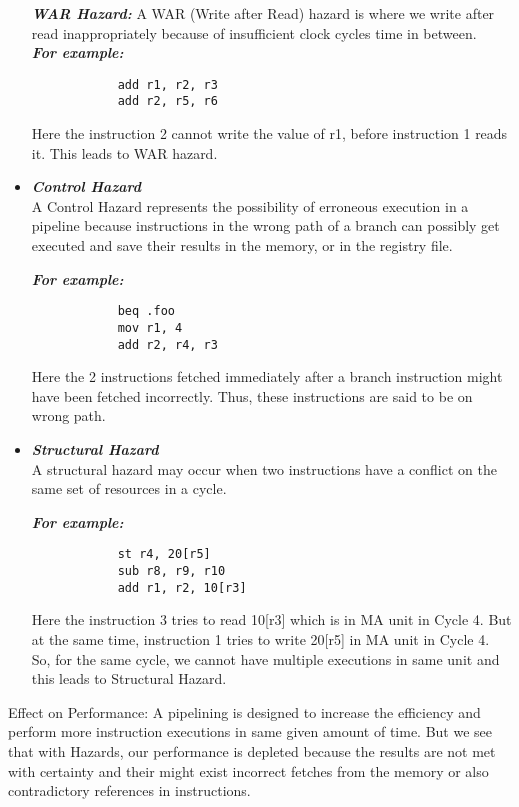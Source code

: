 \documentclass[12pt]{article}
\begin{document}
\begin{itemize}
        \textbf{\textit{WAR Hazard:}} A WAR (Write after Read) hazard is where we write after read inappropriately because of insufficient clock cycles time in between. \\
        \textbf{\textit{For example:}}
        \begin{verbatim}
            add r1, r2, r3
            add r2, r5, r6
        \end{verbatim}
        Here the instruction 2 cannot write the value of r1, before instruction 1 reads it. This leads to WAR hazard.
        
    \item \textbf{\textit{Control Hazard}}\\
        A Control Hazard represents the possibility of erroneous execution in a pipeline because instructions in the wrong path of a branch can possibly get executed and save their results in the memory, or in the registry file.
        
        \textbf{\textit{For example:}}
        \begin{verbatim}
            beq .foo
            mov r1, 4
            add r2, r4, r3
        \end{verbatim}
        Here the 2 instructions fetched immediately after a branch instruction might have been fetched incorrectly. Thus, these instructions are said to be on wrong path.
    
    \item \textbf{\textit{Structural Hazard}}\\
        A structural hazard may occur when two instructions have a conflict on the same set of resources in a cycle.
        
        \textbf{\textit{For example:}}
        \begin{verbatim}
            st r4, 20[r5]
            sub r8, r9, r10
            add r1, r2, 10[r3]
        \end{verbatim}
        
        Here the instruction 3 tries to read 10[r3] which is in MA unit in Cycle 4. But at the same time, instruction 1 tries to write 20[r5] in MA unit in Cycle 4. So, for the same cycle, we cannot have multiple executions in same unit and this leads to Structural Hazard.
\end{itemize}

Effect on Performance: A pipelining is designed to increase the efficiency and perform more instruction executions in same given amount of time. But we see that with Hazards, our performance is depleted because the results are not met with certainty and their might exist incorrect fetches from the memory or also contradictory references in instructions.
\end{document}
